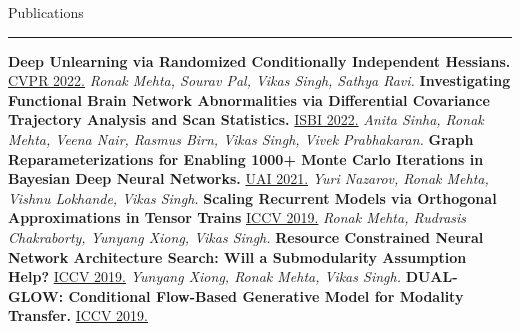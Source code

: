 \documentclass[]{article}
\begin{document}
\vspace{15pt}
{\LARGE Publications}
\vspace{3pt}
\hrule
\vspace{10pt}

\noindent
{\bf Deep Unlearning via Randomized Conditionally Independent Hessians.}
\newline
\href{https://openaccess.thecvf.com/content/CVPR2022/html/Mehta_Deep_Unlearning_via_Randomized_Conditionally_Independent_Hessians_CVPR_2022_paper.html}{CVPR 2022.}
\textit{Ronak Mehta, Sourav Pal, Vikas Singh, Sathya Ravi.}
\newline\newline
{\bf Investigating Functional Brain Network Abnormalities via Differential Covariance Trajectory Analysis and Scan Statistics.}
\newline
\href{https://ieeexplore.ieee.org/document/9761442}{ISBI 2022.}
\textit{Anita Sinha, Ronak Mehta, Veena Nair, Rasmus Birn, Vikas Singh, Vivek Prabhakaran.}
\newline\newline
{\bf Graph Reparameterizations for Enabling 1000+ Monte Carlo Iterations in Bayesian Deep Neural Networks.}
\newline
\href{https://proceedings.mlr.press/v161/nazarovs21b.html}{UAI 2021.}
\textit{Yuri Nazarov, Ronak Mehta, Vishnu Lokhande, Vikas Singh.}
\newline\newline
{\bf Scaling Recurrent Models via Orthogonal Approximations in Tensor Trains}
\newline
\href{http://openaccess.thecvf.com/content_ICCV_2019/html/Mehta_Scaling_Recurrent_Models_via_Orthogonal_Approximations_in_Tensor_Trains_ICCV_2019_paper.html}{ICCV 2019.}
\textit{Ronak Mehta, Rudrasis Chakraborty, Yunyang Xiong, Vikas Singh.}
\newline\newline
{\bf Resource Constrained Neural Network Architecture Search: Will a Submodularity Assumption Help?}
\newline
\href{http://openaccess.thecvf.com/content_ICCV_2019/html/Xiong_Resource_Constrained_Neural_Network_Architecture_Search_Will_a_Submodularity_Assumption_ICCV_2019_paper.html}{ICCV 2019.}
\textit{Yunyang Xiong, Ronak Mehta, Vikas Singh.}
\newline\newline
{\bf  DUAL-GLOW: Conditional Flow-Based Generative Model for Modality Transfer.}
\newline
\href{http://openaccess.thecvf.com/content_ICCV_2019/html/Sun_DUAL-GLOW_Conditional_Flow-Based_Generative_Model_for_Modality_Transfer_ICCV_2019_paper.html}{ICCV 2019.}
\end{document}
